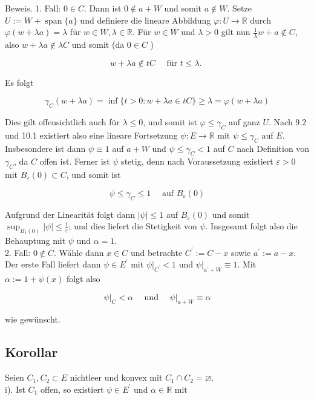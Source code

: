 \documentclass[10pt, letterpaper]{article}
\begin{document}
Beweis. 1. Fall: $0 \in C$. Dann ist $0 \notin a+W$ und somit $a \notin W$. Setze $U:=W+ \operatorname{span}\{a\}$ und definiere die lineare Abbildung $\varphi: U \rightarrow \mathbb{R}$ durch $\varphi(w+\lambda a)=\lambda$ für $w \in W, \lambda \in \mathbb{R}$. Für $w \in W$ und $\lambda>0$ gilt nun $\frac{1}{\lambda} w+a \notin C$, also $w+\lambda a \notin \lambda C$ und somit (da $0 \in C$ )

$$
w+\lambda a \notin t C \quad \text { für } t \leq \lambda \text {. }
$$

Es folgt

$$
\gamma_{C}(w+\lambda a)=\inf \{t>0: w+\lambda a \in t C\} \geq \lambda=\varphi(w+\lambda a)
$$

Dies gilt offensichtlich auch für $\lambda \leq 0$, und somit ist $\varphi \leq \gamma_{C}$ auf ganz $U$. Nach 9.2 und 10.1 existiert also eine lineare Fortsetzung $\psi: E \rightarrow \mathbb{R}$ mit $\psi \leq \gamma_{C}$ auf $E$. Insbesondere ist dann $\psi \equiv 1$ auf $a+W$ und $\psi \leq \gamma_{C}<1$ auf $C$ nach Definition von $\gamma_{C}$, da $C$ offen ist. Ferner ist $\psi$ stetig, denn nach Voraussetzung existiert $\varepsilon>0$ mit $B_{\varepsilon}(0) \subset C$, und somit ist

$$
\psi \leq \gamma_{C} \leq 1 \quad \text { auf } B_{\varepsilon}(0)
$$

Aufgrund der Linearität folgt dann $|\psi| \leq 1$ auf $B_{\varepsilon}(0)$ und somit $\sup _{B_{1}(0)}|\psi| \leq \frac{1}{\varepsilon}$; und dies liefert die Stetigkeit von $\psi$. Insgesamt folgt also die Behauptung mit $\psi$ und $\alpha=1$.\\
2. Fall: $0 \notin C$. Wähle dann $x \in C$ und betrachte $C^{\prime}:=C-x$ sowie $a^{\prime}:=a-x$. Der erste Fall liefert dann $\psi \in E^{\prime}$ mit $\left.\psi\right|_{C^{\prime}}<1$ und $\left.\psi\right|_{a^{\prime}+W} \equiv 1$. Mit $\alpha:=1+\psi(x)$ folgt also

$$
\left.\psi\right|_{C}<\alpha \quad \text { und }\left.\quad \psi\right|_{a+W} \equiv \alpha
$$

wie gewünscht.

\subsection*{Korollar}
Seien $C_{1}, C_{2} \subset E$ nichtleer und konvex mit $C_{1} \cap C_{2}=\varnothing$.\\
i). Ist $C_{1}$ offen, so existiert $\psi \in E^{\prime}$ und $\alpha \in \mathbb{R}$ mit
\end{document}
